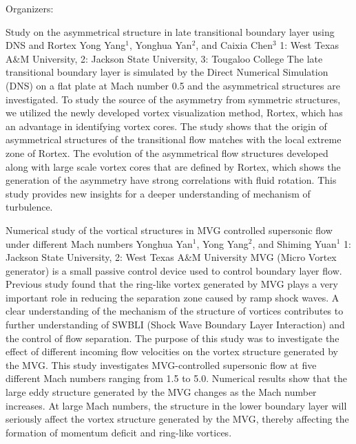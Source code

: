 \label{mini21}

\miniabs
{}
{Organizers: }
{}

\vspace{2ex}
\abs
{Study on the asymmetrical structure in late transitional boundary layer using DNS and Rortex}
{Yong Yang$^{1}$, Yonghua Yan$^{2}$, and Caixia Chen$^{3}$}
{1: West Texas A\&M University, 2: Jackson State University, 3: Tougaloo College}
{The late transitional boundary layer is simulated by the Direct Numerical Simulation (DNS) on a flat plate at Mach number 0.5 and the asymmetrical structures are investigated. To study the source of the asymmetry from symmetric structures, we utilized the newly developed vortex visualization method, Rortex, which has an advantage in identifying vortex cores. The study shows that the origin of asymmetrical structures of the transitional flow matches with the local extreme zone of Rortex. The evolution of the asymmetrical flow structures developed along with large scale vortex cores that are defined by Rortex, which shows the generation of the asymmetry have strong correlations with fluid rotation. This study provides new insights for a deeper understanding of mechanism of turbulence.}


\vspace{1.5ex}
\abs
{Numerical study of the vortical structures in MVG controlled supersonic flow under different Mach numbers}
{Yonghua Yan$^{1}$, Yong Yang$^{2}$, and Shiming Yuan$^{1}$}
{1: Jackson State University, 2: West Texas A\&M University}
{MVG (Micro Vortex generator) is a small passive control device used to control boundary layer flow. Previous study found that the ring-like vortex generated by MVG plays a very important role in reducing the separation zone caused by ramp shock waves. A clear understanding of the mechanism of the structure of vortices contributes to further understanding of SWBLI (Shock Wave Boundary Layer Interaction) and the control of flow separation. The purpose of this study was to investigate the effect of different incoming flow velocities on the vortex structure generated by the MVG. This study investigates MVG-controlled supersonic flow at five different Mach numbers ranging from 1.5 to 5.0. Numerical results show that the large eddy structure generated by the MVG changes as the Mach number increases. At large Mach numbers, the structure in the lower boundary layer will seriously affect the vortex structure generated by the MVG, thereby affecting the formation of momentum deficit and ring-like vortices.}


